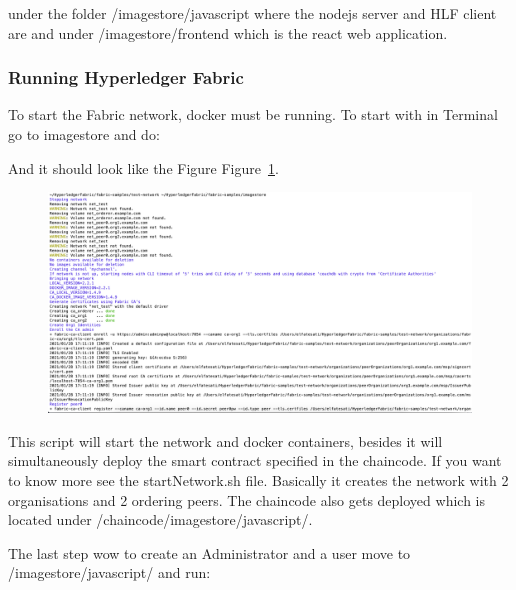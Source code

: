 under the folder
{\selectfont /imagestore/javascript} where the nodejs server and HLF client are and under {\selectfont /imagestore/frontend} which is the react web application.  


\subsubsection{Running Hyperledger Fabric}
To start the Fabric network, docker must be running. 
To start with in Terminal go to {\selectfont imagestore} and do: 

And it should look like the Figure Figure~\ref{fig:eessdffsfsf}.

    \begin{figure}[!htb]
    \centering
    \includegraphics[width=1\textwidth]{figures/RunningHLF.png}
    \caption{ }
    \label{fig:eessdffsfsf}
\end{figure}
This script will start the network and docker containers, besides it will simultaneously deploy the smart contract specified in the chaincode. If you want to know more see the startNetwork.sh file. Basically it creates the network with 2 organisations and 2 ordering peers. The chaincode also gets deployed which is located under 
{\selectfont /chaincode/imagestore/javascript/}.

The last step wow to create an Administrator and a user move to {\selectfont /imagestore/javascript/} and run: 




